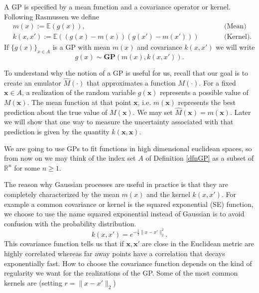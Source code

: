 \documentclass[12pt]{book}
\newcommand{\E}{\mathbb{E}} %
\newcommand{\x}{\textbf{x}}
\begin{document}
A GP is specified by a mean function and a covariance operator or kernel. 
Following  Rasmussen \cite{rasmussen2006gaussian} we define
\begin{align*}
& m(x):=\E(g(x)),&&\qquad\text{(Mean)}\\
& k(x,x'):=\E((g(x)-m(x))(g(x')-m(x')))&&\qquad\text{(Kernel)}.
\end{align*}
If $\{g(x)\}_{x\in A}$ is a GP with mean $m(x)$ and covariance $k(x,x')$ we will write
\begin{equation*}
g(x)\sim \textbf{GP}(m(x),k(x,x')).
\end{equation*} 

To  understand why the notion of a GP is useful for us, recall that our goal is to create
an emulator $\widehat{M}(\cdot)$ that approximates a function $M(\cdot)$. 
For a fixed $\x\in A$, a realization of the  random variable $g(\x)$ represents
a possible value of $M(\x)$. The mean function at that point $\x$, i.e. $m(\x)$ 
represents the best prediction about the true value of $M(\x)$. We may set
$\widehat{M}(\x)=m(\x)$. Later we will show that one way to measure the  uncertainty 
associated with that prediction is given by the quantity $k(\x,\x)$.

 

We are going to use GPs to fit  functions in  high dimensional euclidean spaces, so from 
now on we may think
of the  index set $A$ of Definition \ref{dfnGP} as a subset of $\mathbb{R}^{n}$ for some $n\geq 1$. 
\newline

The reason why  Gaussian processes are useful in practice is that  they are 
completely characterized by the mean $m(x)$ and the kernel $k(x,x')$\cite{lifshits2012lectures}. 
 For example a  common covariance or kernel is the
 squared exponential (SE) function, we choose to use the name squared exponential instead of 
Gaussian is to avoid confusion with
the probability distribution.
\begin{equation}\label{eqnsquareexponential}
k(x,x')=e^{-\frac{1}{2}\|x-x'\|_{2}^{2}}.
\end{equation}
This  covariance function tells us that if $\x,\x'$ are close in the Euclidean metric 
are highly correlated whereas far away points have a correlation that decays exponentially fast.
How to choose the covariance function depends on the kind
of regularity we want for the realizations of the GP. 
Some of the most common kernels are \cite{rasmussen2006gaussian} (setting $r=\|x-x'\|_{2}$)
\end{document}
